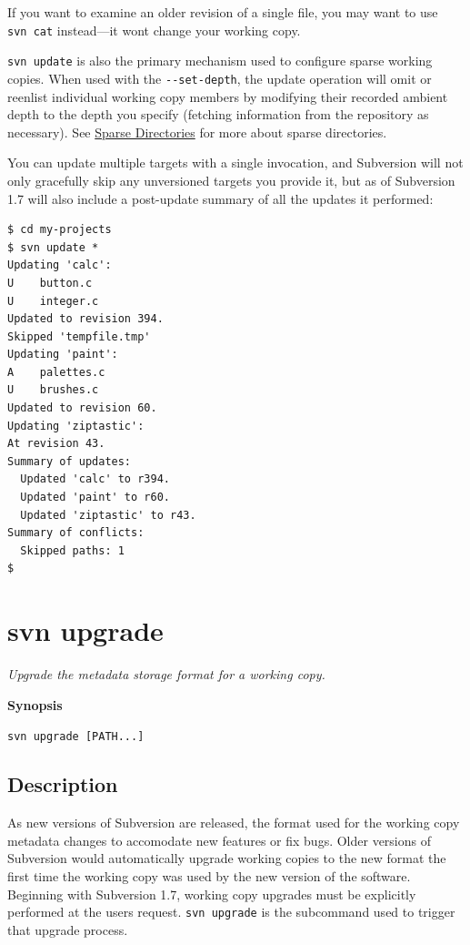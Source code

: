 If you want to examine an older revision of a single file, you may want
to use \texttt{svn\ cat} instead---it won\textquotesingle t change your
working copy.

\texttt{svn\ update} is also the primary mechanism used to configure
sparse working copies. When used with the \texttt{-\/-set-depth}, the
update operation will omit or reenlist individual working copy members
by modifying their recorded ambient depth to the depth you specify
(fetching information from the repository as necessary). See
\hyperref[svn.advanced.sparsedirs]{Sparse Directories} for more about
sparse directories.

You can update multiple targets with a single invocation, and Subversion
will not only gracefully skip any unversioned targets you provide it,
but as of Subversion 1.7 will also include a post-update summary of all
the updates it performed:

\begin{verbatim}
$ cd my-projects
$ svn update *
Updating 'calc':
U    button.c
U    integer.c
Updated to revision 394.
Skipped 'tempfile.tmp'
Updating 'paint':
A    palettes.c
U    brushes.c
Updated to revision 60.
Updating 'ziptastic':
At revision 43.
Summary of updates:
  Updated 'calc' to r394.
  Updated 'paint' to r60.
  Updated 'ziptastic' to r43.
Summary of conflicts:
  Skipped paths: 1
$
\end{verbatim}

\section{svn upgrade}\label{svn.ref.svn.c.upgrade}

\emph{Upgrade the metadata storage format for a working copy.}

\textbf{Synopsis}

\texttt{svn\ upgrade\ {[}PATH...{]}}

\subsection{Description}

As new versions of Subversion are released, the format used for the
working copy metadata changes to accomodate new features or fix bugs.
Older versions of Subversion would automatically upgrade working copies
to the new format the first time the working copy was used by the new
version of the software. Beginning with Subversion 1.7, working copy
upgrades must be explicitly performed at the user\textquotesingle s
request. \texttt{svn\ upgrade} is the subcommand used to trigger that
upgrade process.

